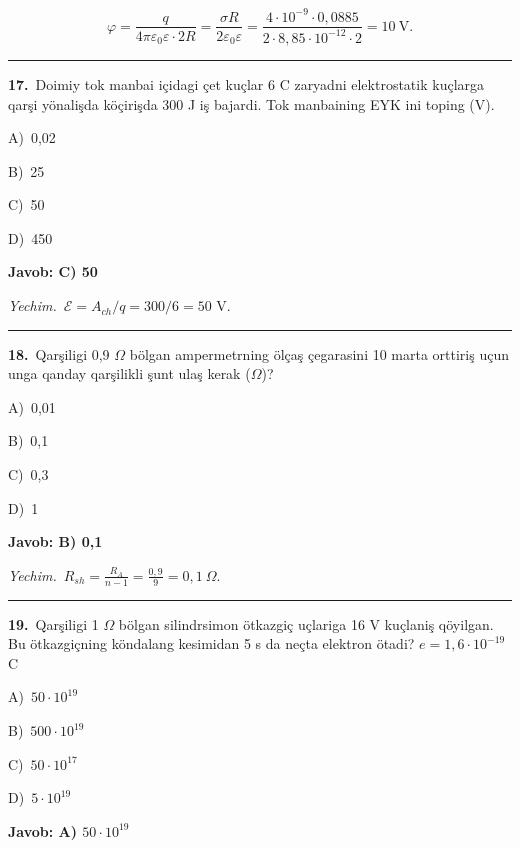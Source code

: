 \documentclass[11pt,a4paper]{article}
\newcommand{\opt}[2]{\hspace*{4mm}#1)\ #2\par}
\begin{document}
\[\varphi=\frac{q}{4\pi\varepsilon_0\varepsilon\cdot2R}=\frac{\sigma R}{2\varepsilon_0\varepsilon}=\frac{4\cdot10^{-9}\cdot0{,}0885}{2\cdot8{,}85\cdot10^{-12}\cdot2}=10\ \text{V}.\]\par\medskip\hrule\medskip
{}\noindent\begin{minipage}{\linewidth}
\textbf{17.}\ Doimiy tok manbai içidagi çet kuçlar 6 C zaryadni elektrostatik kuçlarga qarşi yönalişda köçirişda 300 J iş bajardi. Tok manbaining EYK ini toping (V).\par\smallskip
\opt{A}{0,02}
\opt{B}{25}
\opt{C}{50}
\opt{D}{450}
\end{minipage}\vspace{2pt}\par
\noindent\colorbox{gray!12}{\parbox{\dimexpr\linewidth-2\fboxsep}{\textbf{Javob: C) 50}}}\par\smallskip
\noindent\textit{Yechim.}\ $\mathcal E=A_{ch}/q=300/6=50$ V.\par\par\medskip\hrule\medskip
{}\noindent\begin{minipage}{\linewidth}
\textbf{18.}\ Qarşiligi 0,9 $\Omega$ bölgan ampermetrning ölçaş çegarasini 10 marta orttiriş uçun unga qanday qarşilikli şunt ulaş kerak ($\Omega$)?\par\smallskip
\opt{A}{0,01}
\opt{B}{0,1}
\opt{C}{0,3}
\opt{D}{1}
\end{minipage}\vspace{2pt}\par
\noindent\colorbox{gray!12}{\parbox{\dimexpr\linewidth-2\fboxsep}{\textbf{Javob: B) 0,1}}}\par\smallskip
\noindent\textit{Yechim.}\ $R_{sh}=\frac{R_A}{n-1}=\frac{0{,}9}{9}=0{,}1\ \Omega$.\par\par\medskip\hrule\medskip
{}\noindent\begin{minipage}{\linewidth}
\textbf{19.}\ Qarşiligi 1 $\Omega$ bölgan silindrsimon ötkazgiç uçlariga 16 V kuçlaniş qöyilgan. Bu ötkazgiçning köndalang kesimidan 5 s da neçta elektron ötadi? $e = 1{,}6\cdot10^{-19}$ C\par\smallskip
\opt{A}{$50\cdot10^{19}$}
\opt{B}{$500\cdot10^{19}$}
\opt{C}{$50\cdot10^{17}$}
\opt{D}{$5\cdot10^{19}$}
\end{minipage}\vspace{2pt}\par
\noindent\colorbox{gray!12}{\parbox{\dimexpr\linewidth-2\fboxsep}{\textbf{Javob: A) $50\cdot10^{19}$}}}\par\smallskip
\end{document}
